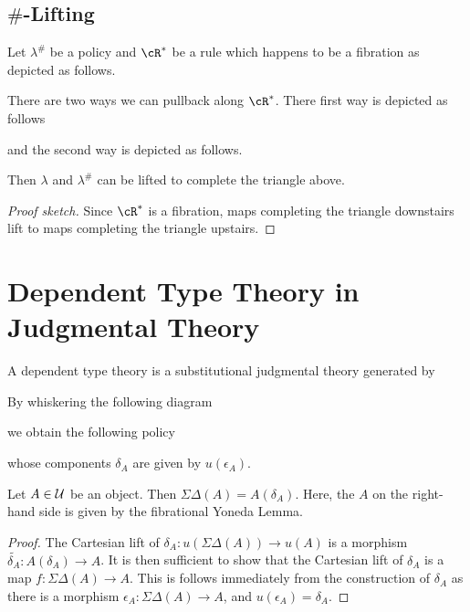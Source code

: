 \documentclass{amsart}
\begin{document}
\subsection{$\#$-Lifting}
\label{sec:sharp-lifting}

Let $\lambda^{\#}$ be a policy and $\cR^{*}$ be a rule which happens to be a fibration as depicted as follows.


There are two ways we can pullback along $\cR^{*}$.
There first way is depicted as follows

and the second way is depicted as follows.

Then $\lambda$ and $\lambda^{\#}$ can be lifted to complete the triangle above.


\begin{proof}[Proof sketch]
  Since $\cR^{*}$ is a fibration, maps completing the triangle downstairs lift to maps completing the triangle upstairs.
\end{proof}

\section{Dependent Type Theory in Judgmental Theory}
\label{sec:dependent-type-theory-in-judgmental-theory}

\begin{defn}
  A dependent type theory is a substitutional judgmental theory generated by
  
\end{defn}
By whiskering the following diagram

we obtain the following policy

whose components $\delta_{A}$ are given by $u(\epsilon_{A})$.

\begin{lem}
  Let $A \in \mathcal{U}$ be an object.
  Then $\Sigma\Delta(A) = A(\delta_{A})$.
  Here, the $A$ on the right-hand side is given by the fibrational Yoneda Lemma.
\end{lem}
\begin{proof}
  The Cartesian lift of $\delta_{A} : u(\Sigma\Delta(A)) \to u(A)$ is a morphism $\widetilde{\delta_{A}} : A(\delta_{A}) \to A$.
  It is then sufficient to show that the Cartesian lift of $\delta_{A}$ is a map $f : \Sigma\Delta(A) \to A$.
  This is follows immediately from the construction of $\delta_{A}$ as there is a morphism $\epsilon_{A} : \Sigma\Delta(A) \to A$, and $u(\epsilon_{A}) = \delta_{A}$.
\end{proof}
\end{document}
